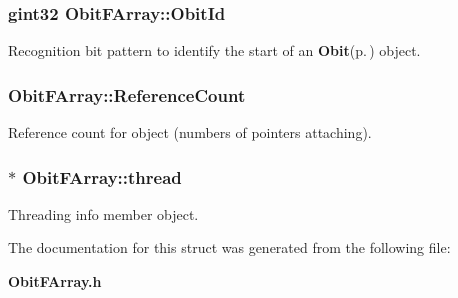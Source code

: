 \subsubsection{\setlength{\rightskip}{0pt plus 5cm}gint32 {\bf Obit\-FArray::Obit\-Id}}\label{structObitFArray_o0}


Recognition bit pattern to identify the start of an {\bf Obit}{\rm (p.\,\pageref{structObit})} object. 

\subsubsection{ {\bf Obit\-FArray::Reference\-Count}}\label{structObitFArray_o2}


Reference count for object (numbers of pointers attaching). 

\subsubsection{$\ast$ {\bf Obit\-FArray::thread}}\label{structObitFArray_o4}


Threading info member object. 



The documentation for this struct was generated from the following file:\begin{CompactItemize}
\item 
{\bf Obit\-FArray.h}\end{CompactItemize}
